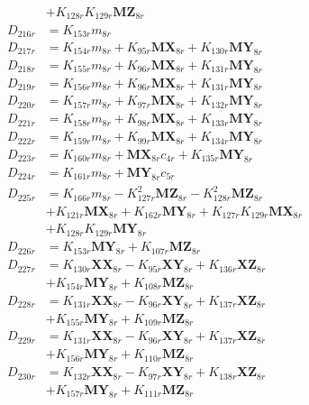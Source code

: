 \begin{multicols}{2}
\begin{align}
&+ K_{128r}K_{129r}\mathbf{MZ}_{8r} \nonumber \\
D_{216r} &= K_{153r}m_{8r} \nonumber \\
D_{217r} &= K_{154r}m_{8r} + K_{95r}\mathbf{MX}_{8r} + K_{130r}\mathbf{MY}_{8r} \nonumber \\
D_{218r} &= K_{155r}m_{8r} + K_{96r}\mathbf{MX}_{8r} + K_{131r}\mathbf{MY}_{8r} \nonumber \\
D_{219r} &= K_{156r}m_{8r} + K_{96r}\mathbf{MX}_{8r} + K_{131r}\mathbf{MY}_{8r} \nonumber \\
D_{220r} &= K_{157r}m_{8r} + K_{97r}\mathbf{MX}_{8r} + K_{132r}\mathbf{MY}_{8r} \nonumber \\
D_{221r} &= K_{158r}m_{8r} + K_{98r}\mathbf{MX}_{8r} + K_{133r}\mathbf{MY}_{8r} \nonumber \\
D_{222r} &= K_{159r}m_{8r} + K_{99r}\mathbf{MX}_{8r} + K_{134r}\mathbf{MY}_{8r} \nonumber \\
D_{223r} &= K_{160r}m_{8r} + \mathbf{MX}_{8r}c_{4r} + K_{135r}\mathbf{MY}_{8r} \nonumber \\
D_{224r} &= K_{161r}m_{8r} + \mathbf{MY}_{8r}c_{5r} \nonumber \\
D_{225r} &= K_{166r}m_{8r} - K_{127r}^2\mathbf{MZ}_{8r} - K_{128r}^2\mathbf{MZ}_{8r}  \nonumber \\
&+ K_{121r}\mathbf{MX}_{8r} + K_{162r}\mathbf{MY}_{8r} + K_{127r}K_{129r}\mathbf{MX}_{8r}  \nonumber \\
&+ K_{128r}K_{129r}\mathbf{MY}_{8r} \nonumber \\
D_{226r} &= K_{153r}\mathbf{MY}_{8r} + K_{107r}\mathbf{MZ}_{8r} \nonumber \\
D_{227r} &= K_{130r}\mathbf{XX}_{8r} - K_{95r}\mathbf{XY}_{8r} + K_{136r}\mathbf{XZ}_{8r}  \nonumber \\
&+ K_{154r}\mathbf{MY}_{8r} + K_{108r}\mathbf{MZ}_{8r} \nonumber \\
D_{228r} &= K_{131r}\mathbf{XX}_{8r} - K_{96r}\mathbf{XY}_{8r} + K_{137r}\mathbf{XZ}_{8r}  \nonumber \\
&+ K_{155r}\mathbf{MY}_{8r} + K_{109r}\mathbf{MZ}_{8r} \nonumber \\
D_{229r} &= K_{131r}\mathbf{XX}_{8r} - K_{96r}\mathbf{XY}_{8r} + K_{137r}\mathbf{XZ}_{8r}  \nonumber \\
&+ K_{156r}\mathbf{MY}_{8r} + K_{110r}\mathbf{MZ}_{8r} \nonumber \\
D_{230r} &= K_{132r}\mathbf{XX}_{8r} - K_{97r}\mathbf{XY}_{8r} + K_{138r}\mathbf{XZ}_{8r}  \nonumber \\
&+ K_{157r}\mathbf{MY}_{8r} + K_{111r}\mathbf{MZ}_{8r} \nonumber \\

\end{align}
\end{multicols}

